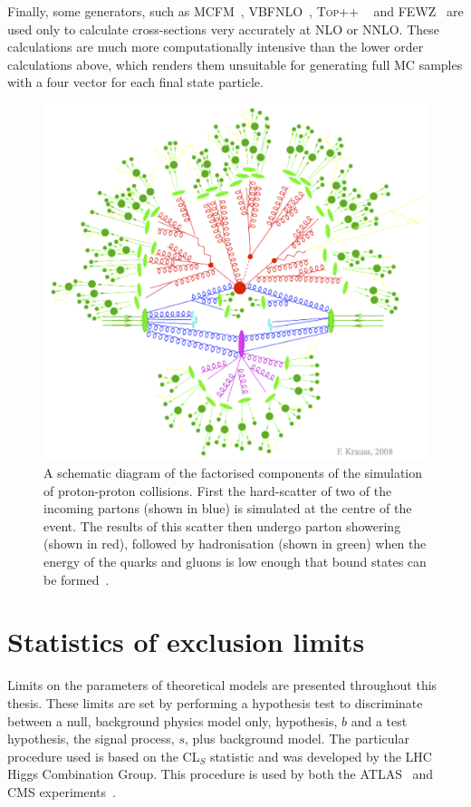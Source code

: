 Finally, some generators, such as MCFM~\cite{PhysRevD.68.094021}, VBFNLO~\cite{Baglio:2014uba,Arnold:2011wj,Arnold20091661}, \textsc{Top++} ~\cite{Czakon20142930} and \textsc{FEWZ}~\cite{PhysRevD.86.094034} are used only to calculate cross-sections very accurately at \ac{NLO} or \ac{NNLO}. These calculations are much more computationally intensive than the lower order calculations above, which renders them unsuitable for generating full \ac{MC} samples with a four vector for each final state particle.

\begin{figure}
  \includegraphics[width=\largefigwidth]{plots/theory/factorisation.png}
  \caption{A schematic diagram of the factorised components of the simulation of proton-proton collisions. First the hard-scatter of two of the incoming partons (shown in blue) is simulated at the centre of the event. The results of this scatter then undergo parton showering (shown in red), followed by hadronisation (shown in green) when the energy of the quarks and gluons is low enough that bound states can be formed~\cite{krauss-diag}.}
  \label{fig:factorisation}
\end{figure}

\section{Statistics of exclusion limits}
\label{sec:stats}
Limits on the parameters of theoretical models are presented throughout this thesis. These limits are set by performing a hypothesis test to discriminate between a null, background physics model only, hypothesis, $b$ and a test hypothesis, the signal process, $s$, plus background model. The particular procedure used is based on the CL$_{S}$ statistic and was developed by the LHC Higgs Combination Group. This procedure is used by both the ATLAS~\cite{Aad:1129811} and CMS experiments~\cite{ATL-PHYS-PUB-2011-011}. 

